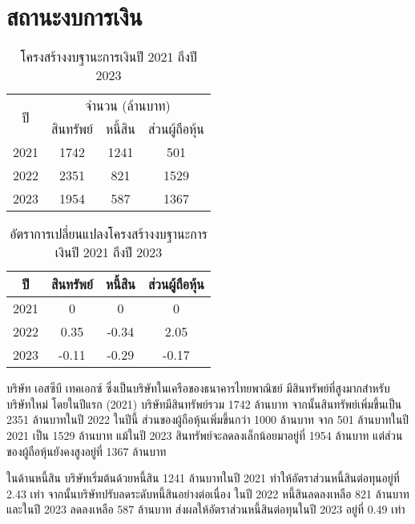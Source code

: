 \section{สถานะงบการเงิน}
\begin{table}[H]
  \centering
  \begin{tabular}{c||c|c|c}
      \multirow{2}{*}{ปี} & \multicolumn{3}{c}{จำนวน (ล้านบาท)} \\
      \cline{2-4}
       & \hspace{2pt} สินทรัพย์ \hspace{2pt} & \hspace{2pt} หนี้สิน \hspace{2pt} & \hspace{2pt} ส่วนผู้ถือหุ้น \hspace{2pt} \\
      \hline\hline
      2021 & 1742 & 1241 & 501 \\
      2022 & 2351 & 821  & 1529\\
      2023 & 1954 & 587  & 1367\\
  \end{tabular}
  \caption{โครงสร้างงบฐานะการเงินปี 2021 ถึงปี 2023}
  \label{tab:company-asset-table-1}
\end{table}
\begin{table}[H]
  \centering
  \begin{tabular}{c||c|c|c}
       ปี & \hspace{2pt} สินทรัพย์ \hspace{2pt} & \hspace{2pt} หนี้สิน \hspace{2pt} & \hspace{2pt} ส่วนผู้ถือหุ้น \hspace{2pt} \\
      \hline\hline
      2021 & 0 & 0  & 0 \\
      2022 & 0.35 & -0.34  & 2.05\\
      2023 & -0.11 & -0.29  & -0.17\\
  \end{tabular}
  \caption{อัตราการเปลี่ยนแปลงโครงสร้างงบฐานะการเงินปี 2021 ถึงปี 2023}
  \label{tab:company-asset-table-2}
\end{table}
บริษัท เอสซีบี เทคเอกซ์ ซึ่งเป็นบริษัทในเครือของธนาคารไทยพาณิชย์ มีสินทรัพย์ที่สูงมากสำหรับบริษัทใหม่ โดยในปีแรก (2021) บริษัทมีสินทรัพย์รวม 1742 ล้านบาท จากนั้นสินทรัพย์เพิ่มขึ้นเป็น 2351 ล้านบาทในปี 2022 ในปีนี้ ส่วนของผู้ถือหุ้นเพิ่มขึ้นกว่า 1000 ล้านบาท จาก 501 ล้านบาทในปี 2021 เป็น 1529 ล้านบาท แม้ในปี 2023 สินทรัพย์จะลดลงเล็กน้อยมาอยู่ที่ 1954 ล้านบาท แต่ส่วนของผู้ถือหุ้นยังคงสูงอยู่ที่ 1367 ล้านบาท

ในด้านหนี้สิน บริษัทเริ่มต้นด้วยหนี้สิน 1241 ล้านบาทในปี 2021 ทำให้อัตราส่วนหนี้สินต่อทุนอยู่ที่ 2.43 เท่า จากนั้นบริษัทปรับลดระดับหนี้สินอย่างต่อเนื่อง ในปี 2022 หนี้สินลดลงเหลือ 821 ล้านบาท และในปี 2023 ลดลงเหลือ 587 ล้านบาท ส่งผลให้อัตราส่วนหนี้สินต่อทุนในปี 2023 อยู่ที่ 0.49 เท่า

